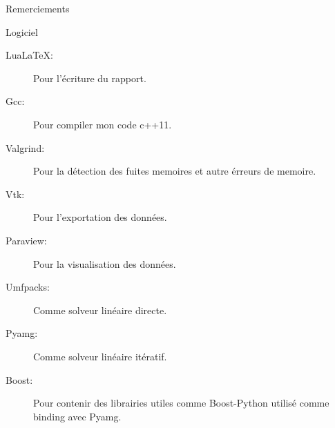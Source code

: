  \begin{frame}{Remerciements}
 \begin{block}{Logiciel}
  \begin{description}
   \item[Lua\LaTeX:] Pour l'écriture du rapport.
   \item[Gcc:] Pour compiler mon code c++11.
   \item[Valgrind:] Pour la détection des fuites memoires et autre érreurs de memoire.
   \item[Vtk:] Pour l'exportation des données.
   \item[Paraview:] Pour la visualisation des données.
   \item[Umfpacks:] Comme solveur linéaire directe.
   \item[Pyamg:] Comme solveur linéaire itératif.
   \item[Boost:] Pour contenir des librairies utiles comme Boost-Python utilisé comme binding avec Pyamg.
  \end{description}

 \end{block}

 
\end{frame}






